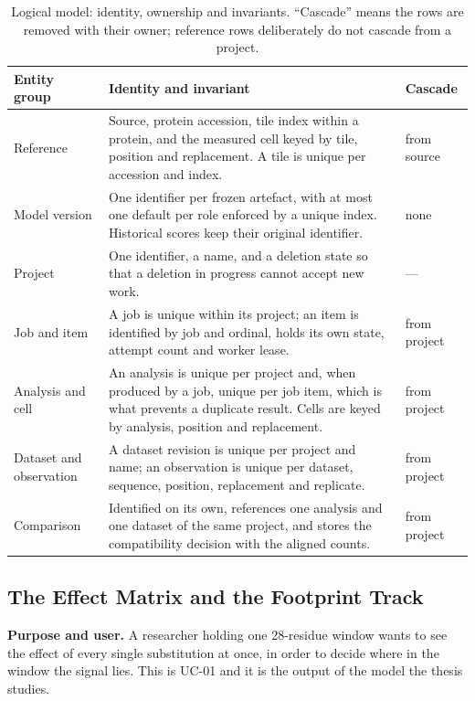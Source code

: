 \begin{table}[htbp]
  \centering
  \caption[Logical model: identity, ownership and invariants]{Logical model: identity, ownership and invariants. ``Cascade'' means the rows are removed
  with their owner; reference rows deliberately do not cascade from a project.}
  \label{tab:app-ldm}
  {\small\setlength{\tabcolsep}{4pt}
  \begin{tabularx}{\textwidth}{lXl}
    \toprule
    Entity group & Identity and invariant & Cascade \\
    \midrule
    Reference & Source, protein accession, tile index within a protein, and the measured cell keyed by
    tile, position and replacement. A tile is unique per accession and index. & from source \\
    Model version & One identifier per frozen artefact, with at most one default per role enforced by
    a unique index. Historical scores keep their original identifier. & none \\
    Project & One identifier, a name, and a deletion state so that a deletion in progress cannot
    accept new work. & --- \\
    Job and item & A job is unique within its project; an item is identified by job and ordinal, holds
    its own state, attempt count and worker lease. & from project \\
    Analysis and cell & An analysis is unique per project and, when produced by a job, unique per job
    item, which is what prevents a duplicate result. Cells are keyed by analysis, position and
    replacement. & from project \\
    Dataset and observation & A dataset revision is unique per project and name; an observation is
    unique per dataset, sequence, position, replacement and replicate. & from project \\
    Comparison & Identified on its own, references one analysis and one dataset of the same project,
    and stores the compatibility decision with the aligned counts. & from project \\
    \bottomrule
  \end{tabularx}}
\end{table}


\subsection{The Effect Matrix and the Footprint Track}
\textbf{Purpose and user.} A researcher holding one 28-residue window wants to see the effect of
every single substitution at once, in order to decide where in the window the signal lies. This is
UC-01 and it is the output of the model the thesis studies.

